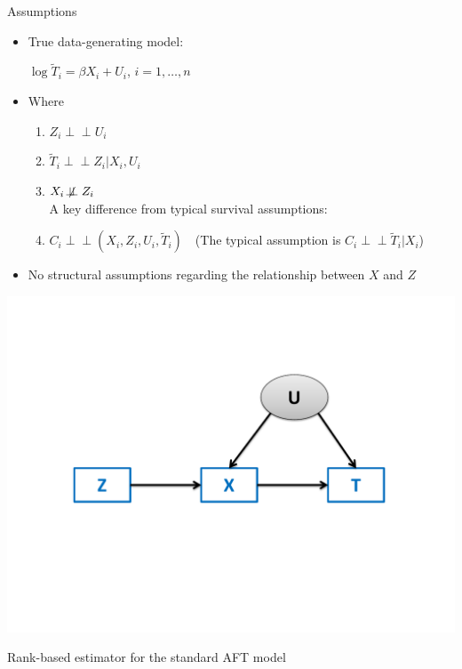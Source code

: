 \documentclass[final,plain]{beamer}
\newlength{\onecolwid}
\newlength{\twocolwid}
\newcommand{\bi}{\begin{itemize}}
\newcommand{\ei}{\end{itemize}}
\newcommand{\colonevsepsmall}{\vspace{8mm}}
\begin{document}
\begin{frame}[t]
\begin{columns}[t]
\begin{column}{\twocolwid}
\begin{columns}[t]
\begin{column}{\onecolwid}
\begin{block}{\Large Assumptions}
{      \bi \itemsep18pt
      \item True data-generating model: \\ 
	\vspace{5pt}
	    \centerline{$\log\widetilde{T}_i = \beta X_i + U_i$, $i=1,\dots,n$}
      \item Where 
	\begin{enumerate}
		\item $Z_i\perp\!\!\!\perp U_i$
		\item $\widetilde{T}_i\perp\!\!\!\perp Z_i|X_i, U_i$
		\item $X_i \not\!\perp\!\!\!\perp Z_i$ \\
			A key difference from typical survival assumptions:
		\item $C_i\perp\!\!\!\perp (X_i, Z_i, U_i, \widetilde{T}_i) \mbox{  }$ (The typical assumption is $C_i\perp\!\!\!\perp \widetilde{T}_i | X_i$)
	\end{enumerate}
      \item No structural assumptions regarding the relationship between $X$ and $Z$
      \ei

    }
\centerline{\href{http://www.stat.wisc.edu/~huling/aftiv_sim}{\includegraphics[width=1.05\onecolwid]{Figs/IV.pdf}}}

    \end{block}

  \colonevsepsmall%


    \begin{block}{Rank-based estimator for the standard AFT model}{

}
\end{block}
\end{column}
\end{columns}
\end{column}
\end{columns}
\end{frame}
\end{document}
